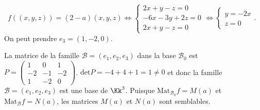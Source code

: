 {{\textbullet~$f((x,y,z)) =(2-a)(x,y,z)\Leftrightarrow\left\{
\begin{array}{l}
2x+y-z=0\\
-6x-3y+2z=0\\
2x+y-z=0
\end{array}
\right.\Leftrightarrow\left\{
\begin{array}{l}
y=-2x\\
z=0
\end{array}
\right.$. On peut prendre $e_3=(1,-2,0)$.

La matrice de la famille $\mathcal{B}=(e_1,e_2,e_3)$ dans la base $\mathcal{B}_0$ est $P=\left(
\begin{array}{ccc}
1&0&1\\
-2&-1&-2\\
1&-2&0
\end{array}
\right)$. $\text{det}P=-4+4+1 =1\neq 0$ et donc la famille $\mathcal{B}=(e_1,e_2,e_3)$ est une base de $\Kk^3$. Puisque $\text{Mat}_{\mathcal{B}_0}f=
M(a)$ et $\text{Mat}_{\mathcal{B}}f=N(a)$, les matrices $M(a)$ et $N(a)$ sont semblables.
}
}

